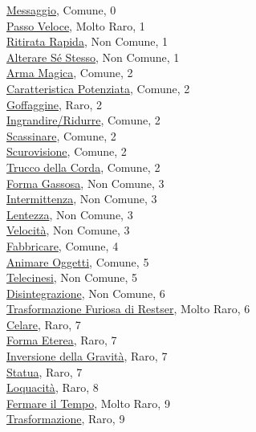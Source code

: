 \begin{multicols}{3}
{{\hyperlink{Messaggio}{Messaggio}, Comune, 0\\
\hyperlink{Passo Veloce}{Passo Veloce}, Molto Raro, 1\\
\hyperlink{Ritirata Rapida}{Ritirata Rapida}, Non Comune, 1\\
\hyperlink{Alterare Sé Stesso}{Alterare Sé Stesso}, Non Comune, 1\\
\hyperlink{Arma Magica}{Arma Magica}, Comune, 2\\
\hyperlink{Caratteristica Potenziata}{Caratteristica Potenziata}, Comune, 2\\
\hyperlink{Goffaggine}{Goffaggine}, Raro, 2\\
\hyperlink{Ingrandire/Ridurre}{Ingrandire/Ridurre}, Comune, 2\\
\hyperlink{Scassinare}{Scassinare}, Comune, 2\\
\hyperlink{Scurovisione}{Scurovisione}, Comune, 2\\
\hyperlink{Trucco della Corda}{Trucco della Corda}, Comune, 2\\
\hyperlink{Forma Gassosa}{Forma Gassosa}, Non Comune, 3\\
\hyperlink{Intermittenza}{Intermittenza}, Non Comune, 3\\
\hyperlink{lentezza}{Lentezza}, Non Comune, 3\\
\hyperlink{Velocità}{Velocità}, Non Comune, 3\\
\hyperlink{Fabbricare}{Fabbricare}, Comune, 4\\
\hyperlink{Animare Oggetti}{Animare Oggetti}, Comune, 5\\
\hyperlink{Telecinesi}{Telecinesi}, Non Comune, 5\\
\hyperlink{Disintegrazione}{Disintegrazione}, Non Comune, 6\\
\hyperlink{Trasformazione Furiosa di Restser}{Trasformazione Furiosa di Restser}, Molto Raro, 6\\
\hyperlink{Celare}{Celare}, Raro, 7\\
\hyperlink{Forma Eterea}{Forma Eterea}, Raro, 7\\
\hyperlink{Inversione della Gravità}{Inversione della Gravità}, Raro, 7\\
\hyperlink{Statua}{Statua}, Raro, 7\\
\hyperlink{Loquacità}{Loquacità}, Raro, 8\\
\hyperlink{Fermare il Tempo}{Fermare il Tempo}, Molto Raro, 9\\
\hyperlink{Trasformazione}{Trasformazione}, Raro, 9

}}
\end{multicols}
